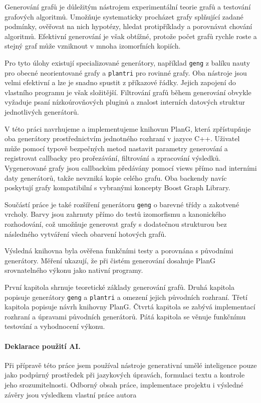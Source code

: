 


Generování grafů je důležitým nástrojem experimentální teorie grafů a
testování grafových algoritmů. Umožňuje systematicky procházet grafy splňující
zadané podmínky, ověřovat na nich hypotézy, hledat protipříklady a porovnávat
chování algoritmů. Efektivní generování je však obtížné, protože počet grafů
rychle roste a stejný graf může vzniknout v mnoha izomorfních kopiích.

Pro tyto úlohy existují specializované generátory, například \texttt{geng}
z balíku nauty pro obecné neorientované grafy a \texttt{plantri} pro rovinné
grafy. Oba nástroje jsou velmi efektivní a lze je snadno spustit z příkazové
řádky. Jejich zapojení do vlastního programu je však složitější. Filtrování
grafů během generování obvykle vyžaduje psaní nízkoúrovňových pluginů a znalost
interních datových struktur jednotlivých generátorů.

V této práci navrhujeme a implementujeme knihovnu PlanG, která zpřístupňuje
oba generátory prostřednictvím jednotného rozhraní v jazyce C++. Uživatel může
pomocí typově bezpečných metod nastavit parametry generování a registrovat
callbacky pro prořezávání, filtrování a zpracování výsledků. Vygenerované grafy
jsou callbackům předávány pomocí views přímo nad interními daty generátorů,
takže nevzniká kopie celého grafu. Oba backendy navíc poskytují grafy
kompatibilní s vybranými koncepty Boost Graph Library.

Součástí práce je také rozšíření generátoru \texttt{geng} o barevné třídy
a zakotvené vrcholy. Barvy jsou zahrnuty přímo do testů izomorfismu a
kanonického rozhodování, což umožňuje generovat grafy s dodatečnou strukturou
bez následného vytváření všech obarvení hotových grafů.

Výsledná knihovna byla ověřena funkčními testy a porovnána s původními
generátory. Měření ukazují, že při čistém generování dosahuje PlanG
srovnatelného výkonu jako nativní programy.

První kapitola shrnuje teoretické základy generování grafů. Druhá kapitola
popisuje generátory \texttt{geng} a \texttt{plantri} a omezení jejich původních
rozhraní. Třetí kapitola popisuje návrh knihovny PlanG. Čtvrtá kapitola se zabývá
implementací rozhraní a úpravami původních generátorů. Pátá kapitola se věnuje funkčnímu
testování a vyhodnocení výkonu.


\paragraph{Deklarace použití AI.}
Při přípravě této práce jsem používal nástroje generativní umělé inteligence pouze 
jako podpůrný prostředek při jazykových úpravách, formulaci textu a kontrole jeho 
srozumitelnosti. Odborný obsah práce, implementace projektu i výsledné závěry jsou 
výsledkem vlastní práce autora


